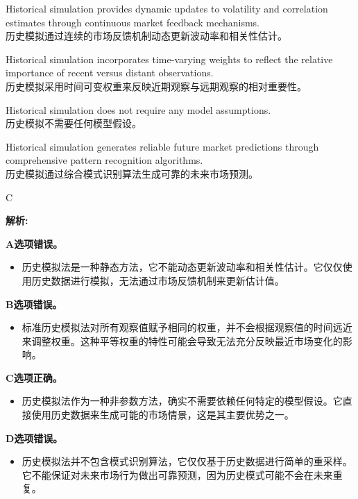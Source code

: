 \documentclass{article}
\newenvironment{explanation}
{\textbf{解析:}\par}
{\par}
\begin{document}
\begin{choices}
    \item Historical simulation provides dynamic updates to volatility and correlation estimates through continuous market feedback mechanisms.\\
    历史模拟通过连续的市场反馈机制动态更新波动率和相关性估计。
    
    \item Historical simulation incorporates time-varying weights to reflect the relative importance of recent versus distant observations.\\
    历史模拟采用时间可变权重来反映近期观察与远期观察的相对重要性。
    
    \item Historical simulation does not require any model assumptions.\\
    历史模拟不需要任何模型假设。
    
    \item Historical simulation generates reliable future market predictions through comprehensive pattern recognition algorithms.\\
    历史模拟通过综合模式识别算法生成可靠的未来市场预测。
\end{choices}

\begin{correctanswer}
    C
\end{correctanswer}

\begin{explanation}
    \textbf{A选项错误。}
    \begin{itemize}
        \item 历史模拟法是一种静态方法，它不能动态更新波动率和相关性估计。它仅仅使用历史数据进行模拟，无法通过市场反馈机制来更新估计值。
    \end{itemize}

    \textbf{B选项错误。}
    \begin{itemize}
        \item 标准历史模拟法对所有观察值赋予相同的权重，并不会根据观察值的时间远近来调整权重。这种平等权重的特性可能会导致无法充分反映最近市场变化的影响。
    \end{itemize}

    \textbf{C选项正确。}
    \begin{itemize}
        \item 历史模拟法作为一种非参数方法，确实不需要依赖任何特定的模型假设。它直接使用历史数据来生成可能的市场情景，这是其主要优势之一。
    \end{itemize}

    \textbf{D选项错误。}
    \begin{itemize}
        \item 历史模拟法并不包含模式识别算法，它仅仅基于历史数据进行简单的重采样。它不能保证对未来市场行为做出可靠预测，因为历史模式可能不会在未来重复。
    \end{itemize}
\end{explanation}
\end{document}

